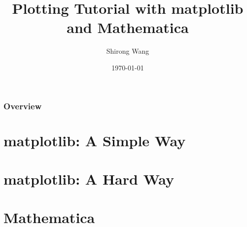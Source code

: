 \documentclass[aspectratio=1610]{beamer}
\title[]{%
\textbf{Plotting Tutorial with matplotlib and Mathematica}
\vspace{15pt}} %
\author{Shirong Wang} %
\institute[] %
{Department of Chemistry,
Fudan University \\ %
}
\date{\today} %
\numberwithin{equation}{section}
\begin{document}
\begin{frame}
\titlepage %
\end{frame}

\begin{frame}
\frametitle{Overview} %
\tableofcontents %
\end{frame}


\section{matplotlib: A Simple Way}

\section{matplotlib: A Hard Way}

\section{Mathematica}


\begin{frame}
~\vspace{50pt}\\



\end{frame}


%
%
%
\end{document}
